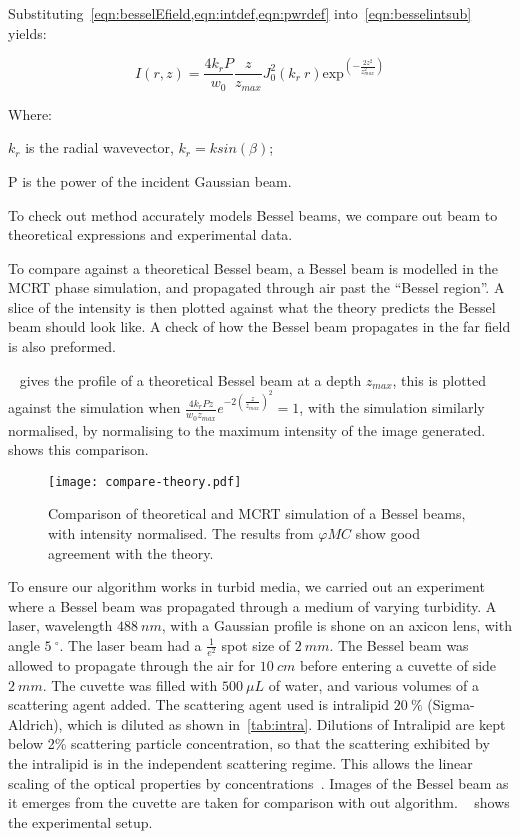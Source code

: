 Substituting~\cref{eqn:besselEfield,eqn:intdef,eqn:pwrdef} into~\cref{eqn:besselintsub} yields:

\begin{equation}
    I(r,z)=\frac{4k_rP}{w_0}\frac{z}{z_{max}}J_0^2\left(k_r\ r\right)\text{exp}^{\left(-\frac{2z^2}{z^2_{max}}\right)}
    \label{eqn:besselInt}
\end{equation}


\noindent Where:

    \indent $k_r$ is the radial wavevector, $k_r=k sin(\beta)$;

    \indent P is the power of the incident Gaussian beam.

    \medskip

To check out method accurately models Bessel beams, we compare out beam to theoretical expressions and experimental data.

To compare against a theoretical Bessel beam, a Bessel beam is modelled in the MCRT phase simulation, and propagated through air past the ``Bessel region''. 
A slice of the intensity is then plotted against what the theory predicts the Bessel beam should look like. 
A check of how the Bessel beam propagates in the far field is also preformed.


~ gives the profile of a theoretical Bessel beam at a depth $z_{max}$, this is plotted against the simulation when $\tfrac{4k_rPz}{w_0z_{max}}e^{-2\left(\tfrac{z}{z_{max}}\right)^2}=1$, with the simulation similarly normalised, by normalising to the maximum intensity of the image generated. ~ shows this comparison.


\begin{figure}[!ht]
    \centering
    \texttt{[image: compare-theory.pdf]}
    \caption{Comparison of theoretical and MCRT simulation of a Bessel beams, with intensity normalised. The results from $\varphi MC$ show good agreement with the theory.}
    \label{fig:besselCompare}
\end{figure}

To ensure our algorithm works in turbid media, we carried out an experiment where a Bessel beam was propagated through a medium of varying turbidity.
A laser, wavelength $488~nm$, with a Gaussian profile is shone on an axicon lens, with angle $5~^{\circ}$.
The laser beam had a $\tfrac{1}{e^2}$ spot size of $2~mm$. 
The Bessel beam was allowed to propagate through the air for $10~cm$ before entering a cuvette of side $2~mm$.
The cuvette was filled with $500~\mu L$ of water, and various volumes of a scattering agent added.
The scattering agent used is intralipid $20~\%$ (Sigma-Aldrich), which is diluted as shown in~\cref{tab:intra}.
Dilutions of Intralipid are kept below 2\% scattering particle concentration, so that the scattering exhibited by the intralipid is in the independent scattering regime.
This allows the linear scaling of the optical properties by concentrations~\cite{aernouts2013supercontinuum,vardaki2015studying,di2011effect}.
Images of the Bessel beam as it emerges from the cuvette are taken for comparison with out algorithm.
~ shows the experimental setup.

